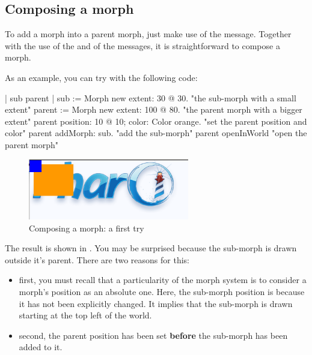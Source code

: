 \documentclass[a4paper,10pt,twoside]{book}
\begin{document}
\subsection{Composing a morph}
To add a morph into a parent morph, just make use of the  message. Together with the use of the  and of the  messages, it is straightforward to compose a morph.


As an example, you can try with the following code:

\begin{code}
| sub parent |
sub := Morph new extent: 30 @ 30. "the sub-morph with a small extent"
parent := Morph new extent: 100 @ 80. "the parent morph with a bigger extent"
parent position: 10 @ 10; color: Color orange. "set the parent position and color"
parent addMorph: sub. "add the sub-morph"
parent openInWorld "open the parent morph"
\end{code}

\begin{figure}[htbp]
\begin{center}
	\includegraphics[width=7cm]{composingMorph1}
	\caption{Composing a morph: a first try}
\end{center}
\end{figure}

The result is shown in . You may be surprised because the sub-morph is drawn outside it's parent. There are two reasons for this:
\begin{itemize}
\item first, you must recall that a particularity of the morph system is to consider a morph's position as an absolute one. Here, the sub-morph position is  because it has not been explicitly changed. It implies that the sub-morph is drawn starting at the top left of the world.
\item second, the parent position has been set \textbf{before} the sub-morph has been added to it.
\end{itemize}
\end{document}
